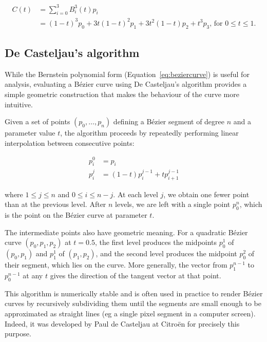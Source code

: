\begin{small}
\begin{align}
\label{eq:bezier3}
C(t) &= \sum_{i=0}^3 B^3_i(t) p_i \nonumber \\
&= (1-t)^3 p_0 + 3 t (1-t)^2 p_1 + 3 t^2 (1-t) p_2 + t^3 p_3\text{, for }0 \leq t \leq 1.
\end{align}
\end{small}

\subsection{De Casteljau's algorithm}
\label{sec:decasteljau}

While the Bernstein polynomial form (Equation~\ref{eq:beziercurve}) is useful for analysis, evaluating a B\'ezier curve using De Casteljau's algorithm provides a simple geometric construction that makes the behaviour of the curve more intuitive.

Given a set of points \((p_0, \ldots, p_n)\) defining a B\'ezier segment of degree \(n\) and a parameter value \(t\), the algorithm proceeds by repeatedly performing linear interpolation between consecutive points:

\begin{align}
p_i^{0} &= p_i \nonumber \\
p_i^{j} &= (1-t) p_i^{j-1} + t p_{i+1}^{j-1}
\end{align}

where \(1 \leq j \leq n\) and \(0 \leq i \leq n-j\).
At each level \(j\), we obtain one fewer point than at the previous level.
After \(n\) levels, we are left with a single point \(p_0^{n}\), which is the point on the B\'ezier curve at parameter \(t\).

The intermediate points also have geometric meaning.
For a quadratic B\'ezier curve \((p_0, p_1, p_2)\) at \(t=0.5\), the first level produces the midpoints \(p_0^1\) of \((p_0, p_1)\) and \(p_1^1\) of \((p_1, p_2)\), and the second level produces the midpoint \(p_0^2\) of their segment, which lies on the curve.
More generally, the vector from \(p_1^{n-1}\) to \(p_0^{n-1}\) at any \(t\) gives the direction of the tangent vector at that point.

This algorithm is numerically stable and is often used in practice to render B\'ezier curves by recursively subdividing them until the segments are small enough to be approximated as straight lines (eg a single pixel segment in a computer screen).
Indeed, it was developed by Paul de Casteljau at Citro\"en for precisely this purpose.

